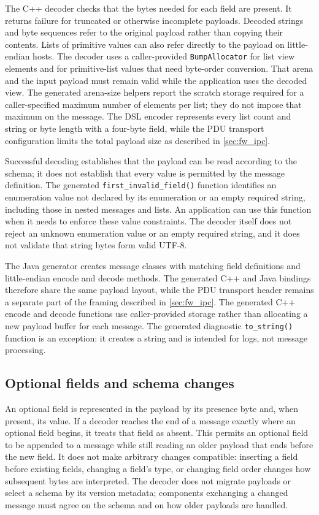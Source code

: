 The C++ decoder checks that the bytes needed for each field are present. It
returns failure for truncated or otherwise incomplete payloads. Decoded
strings and byte sequences refer to the original payload rather than copying
their contents. Lists of primitive values can also refer directly to the
payload on little-endian hosts. The decoder uses a caller-provided
\texttt{BumpAllocator} for list view elements and for primitive-list values
that need byte-order conversion. That arena and the input payload must remain
valid while the application uses the decoded view. The generated arena-size
helpers report the scratch storage required for a caller-specified maximum
number of elements per list; they do not impose that maximum on the message.
The DSL encoder represents every list count and string or byte length with a
four-byte field, while the PDU transport configuration limits the total
payload size as described in \cref{sec:fw_ipc}.

Successful decoding establishes that the payload can be read according to the
schema; it does not establish that every value is permitted by the message
definition. The generated \texttt{first\_invalid\_field()} function identifies
an enumeration value not declared by its enumeration or an empty required
string, including those in nested messages and lists. An application can use
this function when it needs to enforce these value constraints. The decoder
itself does not reject an unknown enumeration value or an empty required
string, and it does not validate that string bytes form valid UTF-8.

The Java generator creates message classes with matching field definitions
and little-endian encode and decode methods. The generated C++ and Java
bindings therefore share the same payload layout, while the PDU transport
header remains a separate part of the framing described in
\cref{sec:fw_ipc}. The generated C++ encode and decode functions use
caller-provided storage rather than allocating a new payload buffer for each
message. The generated diagnostic \texttt{to\_string()} function is an
exception: it creates a string and is intended for logs, not message
processing.

\subsection{Optional fields and schema changes}

An optional field is represented in the payload by its presence byte and, when
present, its value. If a decoder reaches the end of a message exactly where
an optional field begins, it treats that field as absent. This permits an
optional field to be appended to a message while still reading an older
payload that ends before the new field. It does not make arbitrary changes
compatible: inserting a field before existing fields, changing a field's
type, or changing field order changes how subsequent bytes are interpreted.
The decoder does not migrate payloads or select a schema by its version
metadata; components exchanging a changed message must agree on the schema
and on how older payloads are handled.

